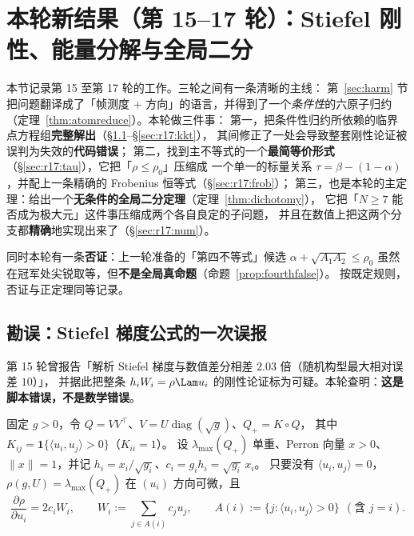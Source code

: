 \section{本轮新结果（第 15--17 轮）：Stiefel 刚性、能量分解与全局二分}\label{sec:r1517}

本节记录第 15 至第 17 轮的工作。三轮之间有一条清晰的主线：
第~\ref{sec:harm} 节把问题翻译成了「帧测度 $+$ 方向」的语言，并得到了一个\emph{条件性}的六原子归约
（定理~\ref{thm:atomreduce}）。本轮做三件事：
第一，把条件性归约所依赖的临界点方程组\textbf{完整解出}（\S\ref{sec:r17:erratum}--\S\ref{sec:r17:kkt}），
其间修正了一处会导致整套刚性论证被误判为失效的\textbf{代码错误}；
第二，找到主不等式的一个\textbf{最简等价形式}（\S\ref{sec:r17:tau}），它把「$\rho\le\rho_0$」压缩成
一个单一的标量关系 $\tau=\beta-(1-\alpha)$，并配上一条精确的 Frobenius 恒等式（\S\ref{sec:r17:frob}）；
第三，也是本轮的主定理：给出一个\textbf{无条件的全局二分定理}（定理~\ref{thm:dichotomy}），
它把「$N\ge7$ 能否成为极大元」这件事压缩成两个各自良定的子问题，
并且在数值上把这两个分支都\textbf{精确}地实现出来了（\S\ref{sec:r17:num}）。

同时本轮有一条\textbf{否证}：上一轮准备的「第四不等式」候选 $\alpha+\sqrt{A_1A_2}\le\rho_0$
虽然在冠军处尖锐取等，但\textbf{不是全局真命题}（命题~\ref{prop:fourthfalse}）。
按既定规则，否证与正定理同等记录。

\subsection{勘误：Stiefel 梯度公式的一次误报}\label{sec:r17:erratum}

第 15 轮曾报告「解析 Stiefel 梯度与数值差分相差 $2.03$ 倍（随机构型最大相对误差 $10$）」，
并据此把整条 $h_iW_i=\rho\Lam u_i$ 的刚性论证标为可疑。本轮查明：\textbf{这是脚本错误，不是数学错误}。

\begin{proposition}[正部的环境梯度]\label{prop:gradformula}
固定 $g>0$，令 $Q=VV^\top$、$V=U\operatorname{diag}(\sqrt g)$、$Q_+=K\circ Q$，
其中 $K_{ij}=\mathbf 1\{\langle u_i,u_j\rangle>0\}$（$K_{ii}=1$）。
设 $\lambda_{\max}(Q_+)$ 单重、Perron 向量 $x>0$、$\|x\|=1$，并记 $h_i=x_i/\sqrt{g_i}$、$c_i=g_ih_i=\sqrt{g_i}\,x_i$。
只要没有 $\langle u_i,u_j\rangle=0$，$\rho(g,U)=\lambda_{\max}(Q_+)$ 在 $(u_i)$ 方向可微，且
\begin{equation}\label{eq:gradu}
\frac{\partial\rho}{\partial u_i}=2c_iW_i,\qquad
W_i:=\sum_{j\in A(i)}c_ju_j,\qquad A(i):=\{j:\langle u_i,u_j\rangle>0\}\ \ (\text{含 }j=i).
\end{equation}
\end{proposition}


